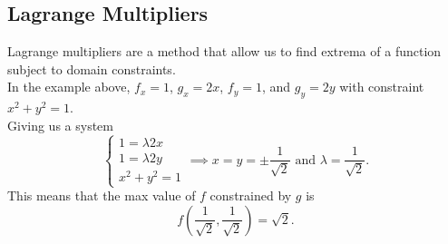 \subsection{Lagrange Multipliers}
\noindent
Lagrange multipliers are a method that allow us to find extrema of a function subject to domain constraints.\\



\noindent
In the example above, $f_x = 1$, $g_x = 2x$, $f_y = 1$, and $g_y = 2y$ with constraint $x^2 + y^2 = 1$.\\ 
Giving us a system
\begin{equation*}
	\begin{cases}
		1 = \lambda 2x \\ 
		1 = \lambda 2y \\ 
		x^2 + y^2 = 1
	\end{cases} \implies x = y = \pm \frac{1}{\sqrt{2}}\text{ and } \lambda = \frac{1}{\sqrt{2}}.
\end{equation*}
This means that the max value of $f$ constrained by $g$ is
\begin{equation*}
	f\left(\frac{1}{\sqrt{2}},\frac{1}{\sqrt{2}}\right) = \sqrt{2}.
\end{equation*}

